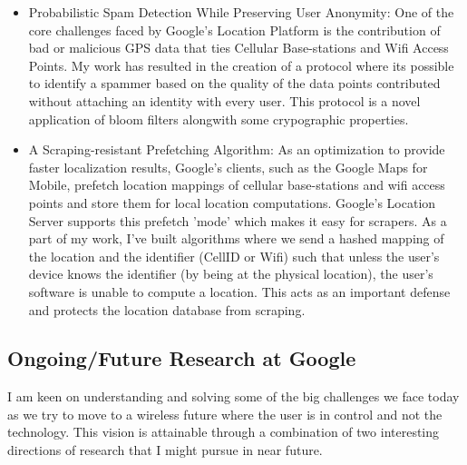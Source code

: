 \documentclass[11pt,letterpaper]{article}
\begin{document}
\begin{itemize}
 \item Probabilistic Spam Detection While Preserving User Anonymity: One of the core challenges faced by Google's Location
 Platform is the contribution of bad or malicious GPS data that ties Cellular Base-stations and Wifi Access Points. My work
has resulted in the creation of a protocol where its possible to identify a spammer based on the quality of the data
points contributed without attaching an identity with every user. This protocol is a novel application of bloom filters alongwith 
some crypographic properties.

 \item A Scraping-resistant Prefetching Algorithm: As an optimization to provide faster localization results, Google's
 clients, such as the Google Maps for Mobile, prefetch location mappings of cellular base-stations and wifi access points and store
 them for local location computations. Google's Location Server supports this prefetch 'mode' which makes it easy for scrapers. 
 As a part of my work, I've built algorithms where we send a hashed mapping of the location and the identifier (CellID or Wifi)
 such that unless the user's device knows the identifier (by being at the physical location), the user's software is unable to
 compute a location. This acts as an important defense and protects the location database from scraping.
\end{itemize}


\subsection*{Ongoing/Future Research at Google} I am keen on
understanding and solving some of the big challenges we face today as we try to move to a  wireless future
where the user is in control and not the technology. This vision is attainable through a combination of two interesting 
directions of research that I might pursue in near future.
\end{document}
